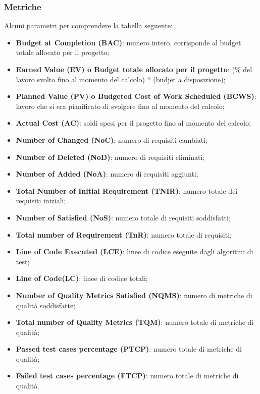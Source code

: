 \subsubsection{Metriche}
Alcuni parametri per comprendere la tabella seguente:
\begin{itemize}
	\item \textbf{Budget at Completion (BAC)}: numero intero, corrisponde al budget totale allocato per il progetto;

	\item \textbf{Earned Value (EV) o Budget totale allocato per il progetto}: (\% del lavoro svolto fino al momento del calcolo) * (budjet a disposizione);
	
	\item \textbf{Planned Value (PV) o Budgeted Cost of Work Scheduled (BCWS)}: lavoro che si era pianificato di svolgere fino al momento del calcolo;
	
	\item \textbf{Actual Cost (AC)}: soldi spesi per il progetto fino al momento del calcolo;
	
	\item \textbf{Number of Changed (NoC)}: numero di requisiti cambiati;
	
	\item \textbf{Number of Deleted (NoD)}: numero di requisiti eliminati;
	
	\item \textbf{Number of Added (NoA)}: numero di requisiti aggiunti;
	
	\item \textbf{Total Number of Initial Requirement (TNIR)}: numero totale dei requisiti iniziali;
	
	\item \textbf{Number of Satisfied (NoS)}: numero totale di requisiti soddisfatti;
	
	\item \textbf{Total number of Requirement (TnR)}: numero totale di requisiti;
	
	\item \textbf{Line of Code Executed (LCE)}: linee di codice eseguite dagli algoritmi di test;
	
	\item \textbf{Line of Code(LC)}: linee di codice totali;
	
	\item \textbf{Number of Quality Metrics Satisfied (NQMS)}: numero di metriche di qualità soddisfatte;
	
	\item \textbf{Total number of Quality Metrics (TQM)}: numero totale di metriche di qualità;
	
	\item \textbf{Passed test cases percentage (PTCP)}: numero totale di metriche di qualità;
	
	\item \textbf{Failed test cases percentage (FTCP)}: numero totale di metriche di qualità.
	
\end{itemize}

